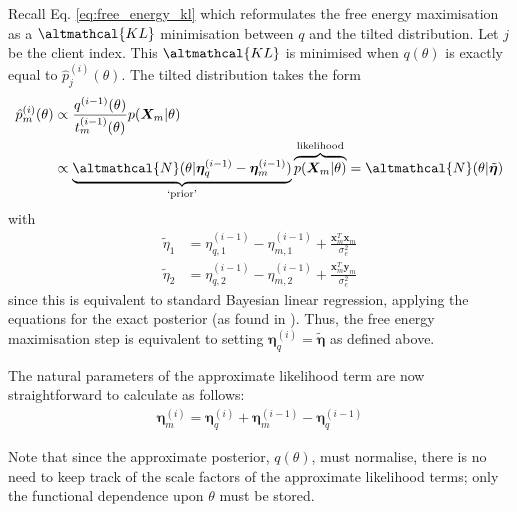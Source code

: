 Recall Eq. \eqref{eq:free_energy_kl} which reformulates the free energy maximisation as a $\altmathcal{KL}$ minimisation between $q$ and the tilted distribution. Let $j$ be the client index. This $\altmathcal{KL}$ is minimised when $q(\theta)$ is exactly equal to $\hat{p}_j^{(i)}(\theta)$. The tilted distribution takes the form
\begin{align}
\hat{p}^{(i)}_{m}(\theta) &\propto  \frac{q^{(i-1)}(\theta)}{t_{m}^{(i-1)}(\theta)} p(\bm{X}_{m}| \theta)\nonumber \\
&\propto \underbrace{\altmathcal{N}(\theta| \bm{\eta}_q^{(i-1)} - \bm{\eta}_m^{(i-1)})}_{\text{`prior'}} \overbrace{p(\bm{X}_{m}| \theta)}^{\text{likelihood}}
= \altmathcal{N}(\theta| \tilde{\bm{\eta}}) 
\end{align}
with
\begin{align}
\tilde{\eta}_1 &= \eta_{q, 1}^{(i-1)} - \eta_{m, 1}^{(i-1)} + \frac{\bm{x}_m^T \bm{x}_m}{\sigma_e^2} \label{eq:exact_update_one}\\ 
\tilde{\eta}_2 &= \eta_{q, 2}^{(i-1)} - \eta_{m, 2}^{(i-1)} + \frac{\bm{x}_m^T \bm{y}_m}{\sigma_e^2} \label{eq:exact_update_two}
\end{align}
since this is equivalent to standard Bayesian linear regression, applying the equations for the exact posterior (as found in \cite{Bishop:2006}). Thus, the free energy maximisation step is equivalent to setting $\bm{\eta}_q^{(i)} = \tilde{\bm{\eta}}$ as defined above. 

The natural parameters of the approximate likelihood term are now straightforward to calculate as follows:
\begin{align}
\bm{\eta}_{m}^{(i)} = \bm{\eta}_{q}^{(i)} + \bm{\eta}_{m}^{(i-1)}  - \bm{\eta}_{q}^{(i-1)} 
\end{align}

Note that since the approximate posterior, $q(\theta)$, must normalise, there is no need to keep track of the scale factors of the approximate likelihood terms; only the functional dependence upon $\theta$ must be stored.

